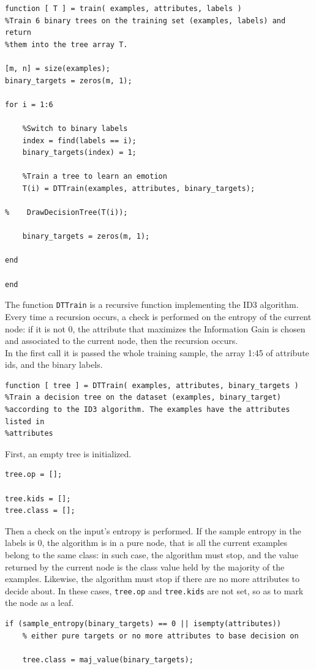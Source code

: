 \documentclass{article}
\begin{document}
\begin{lstlisting}
function [ T ] = train( examples, attributes, labels )
%Train 6 binary trees on the training set (examples, labels) and return
%them into the tree array T.

[m, n] = size(examples); 
binary_targets = zeros(m, 1);

for i = 1:6
   
    %Switch to binary labels
    index = find(labels == i);
    binary_targets(index) = 1;
    
    %Train a tree to learn an emotion
    T(i) = DTTrain(examples, attributes, binary_targets);
    
%    DrawDecisionTree(T(i));
    
    binary_targets = zeros(m, 1);
    
end

end
\end{lstlisting}
The function \verb$DTTrain$ is a recursive function implementing the ID3 algorithm. Every time a recursion occurs, a check is performed on the entropy of the current node: if it is not 0, the attribute that maximizes the Information Gain is chosen and associated to the current node, then the recursion occurs.\\
In the first call it is passed the whole training sample, the array 1:45 of attribute ids, and the binary labels.
\begin{lstlisting}
function [ tree ] = DTTrain( examples, attributes, binary_targets )
%Train a decision tree on the dataset (examples, binary_target)
%according to the ID3 algorithm. The examples have the attributes listed in
%attributes
\end{lstlisting}
First, an empty tree is initialized.
\begin{lstlisting}[firstnumber=6]
%Initialize an empty tree
tree.op = [];

tree.kids = [];
tree.class = [];
\end{lstlisting}
Then a check on the input's entropy is performed. If the sample entropy in the labels is 0, the algorithm is in a pure node, that is all the current examples belong to the same class: in such case, the algorithm must stop, and the value returned by the current node is the class value held by the majority of the examples. Likewise, the algorithm must stop if there are no more attributes to decide about. In these cases, \verb$tree.op$ and \verb$tree.kids$ are not set, so as to mark the node as a leaf.
\begin{lstlisting}[firstnumber=12]
if (sample_entropy(binary_targets) == 0 || isempty(attributes))   
    % either pure targets or no more attributes to base decision on
    
    tree.class = maj_value(binary_targets);
\end{lstlisting}
\end{document}
